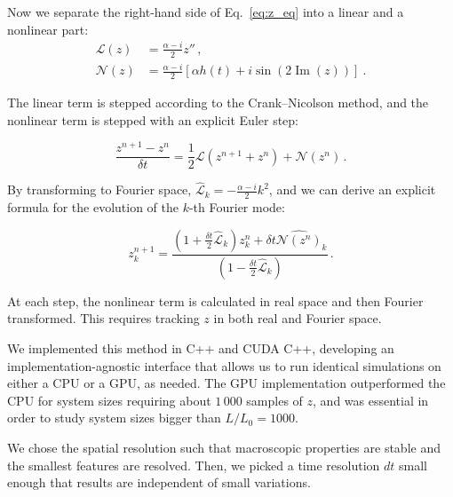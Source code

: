 \documentclass[prb,aps,twocolumn,superscriptaddress,floatfix]{revtex4-1}
\newcommand{\alecom}[1]{{\color{red}#1}}
\begin{document}
Now we separate the right-hand side of Eq.~\eqref{eq:z_eq} into a linear and a nonlinear part:
\begin{equation}
\begin{split}
    \mathcal L(z) &= \frac{\alpha-i}{2}z'' \, ,\\
    \mathcal{N}(z)&=\frac{\alpha-i}{2}[\alpha h(t)+i\sin\left(2\operatorname{Im}(z)\right)]\ .
\end{split}
    \label{eq:lin_nonlin}
\end{equation}

The linear term is stepped according to the Crank--Nicolson method, and the nonlinear term is stepped with an explicit Euler step:

\begin{equation}
\frac{z^{n+1}-z^{n}}{\delta t}=\frac 1 2 \mathcal L(z^{n+1}+z^{n})+\mathcal N(z^n)\, .
    \label{eq:stepping}
\end{equation}

By transforming to Fourier space, $\hat {\mathcal {L}}_k=-\frac{\alpha-i}{2}k^2$, and we can derive an explicit formula for the evolution of the $k$-th Fourier mode:

\begin{equation}
    z^{n+1}_k=\frac{\left(1+\frac{\delta t}{2}\hat{\mathcal L}_k\right)z_k^n+\delta t \widehat{\mathcal N(z^n)}_k}{\left( 1-\frac{\delta t} {2} \hat {\mathcal L}_k \right)} \, .
\end{equation}

At each step, the nonlinear term is calculated in real space and then Fourier transformed. This requires tracking $z$ in both real and Fourier space.


We implemented this method in C++ and CUDA C++, developing an implementation-agnostic interface that allows us to run identical simulations on either a CPU or a GPU, as needed. The GPU implementation outperformed the CPU for system sizes requiring about $1\,000$ samples of $z$, and was essential in order to study system sizes bigger than $L/L_0=1000$. 

We chose the spatial resolution such that macroscopic properties are stable and the smallest features are resolved. Then, we picked a time resolution $dt$ small enough that results are independent of small variations. 

\end{document}
